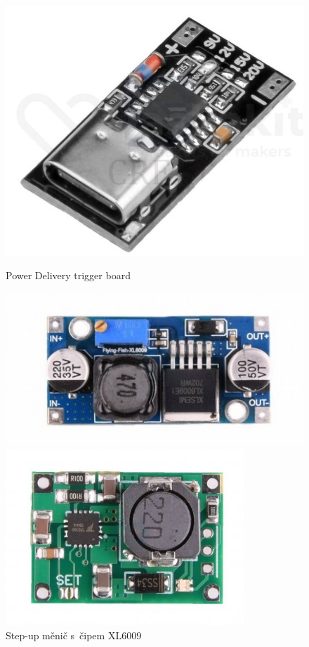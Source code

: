 \begin{figure}[htb]
  \centering
  \begin{minipage}{0.25\textwidth}
    \centering
  \includegraphics[width=1\textwidth]{img/PDtrig.jpg}
  \caption{\label{fig:PDtrig} Power Delivery trigger board~\cite{laskakit-PD}}
  \end{minipage}\hfill
  \begin{minipage}{0.35\textwidth}
    \centering
  \includegraphics[width=1\textwidth]{img/XL6009.jpg}
  \caption{\label{fig:XL6009} Step-up měnič s~čipem XL6009~\cite{laskakit-XL6009}}
  \end{minipage}\hfill
  \begin{minipage}{0.3\textwidth}
    \centering
    \includegraphics[width=0.8\textwidth]{img/TP5100.jpg}

\end{minipage}
\end{figure}
